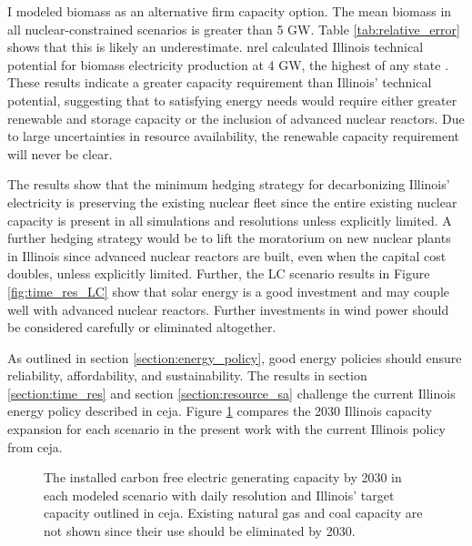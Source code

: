 I modeled biomass as an alternative firm capacity option. The mean biomass in all
nuclear-constrained scenarios is greater than 5 GW. Table \ref{tab:relative_error}
shows that this is likely an underestimate. \gls{nrel} calculated Illinois technical
potential for biomass electricity production at 4 GW, the highest of any state
\cite{lopez_us_2012}. These results indicate a greater capacity requirement than
Illinois' technical potential, suggesting that to satisfying energy needs would
require either greater renewable and storage capacity or the inclusion of advanced
nuclear reactors. Due to large uncertainties in resource availability, the renewable
capacity requirement will never be clear.

The results show that the minimum hedging strategy for decarbonizing Illinois'
electricity is preserving the existing nuclear fleet since the entire existing
nuclear capacity is present in all simulations and resolutions unless explicitly
limited. A further hedging strategy would be to lift the moratorium on new nuclear
plants in Illinois since advanced nuclear reactors are built, even when the
capital cost doubles, unless explicitly limited. Further, the \gls{LC} scenario
results in Figure \ref{fig:time_res_LC} show that solar energy is a good investment
and may couple well with advanced nuclear reactors. Further investments in wind
power should be considered carefully or eliminated altogether.

As outlined in section \ref{section:energy_policy}, good energy policies should
ensure reliability, affordability, and sustainability. The results in section
\ref{section:time_res} and section \ref{section:resource_sa} challenge the
current Illinois energy policy described in \gls{ceja}. Figure \ref{fig:compare_ceja}
compares the 2030 Illinois capacity expansion for each scenario in the present
work with the current Illinois policy from \gls{ceja}.

\begin{figure}[H]
  \centering
  \resizebox{0.85\columnwidth}{!}{}
  \caption{The installed carbon free electric generating capacity by 2030 in
  each modeled scenario with daily resolution and Illinois' target capacity outlined
  in \gls{ceja}. Existing natural gas and coal capacity are not shown since their
  use should be eliminated by 2030.}
  \label{fig:compare_ceja}
\end{figure}

